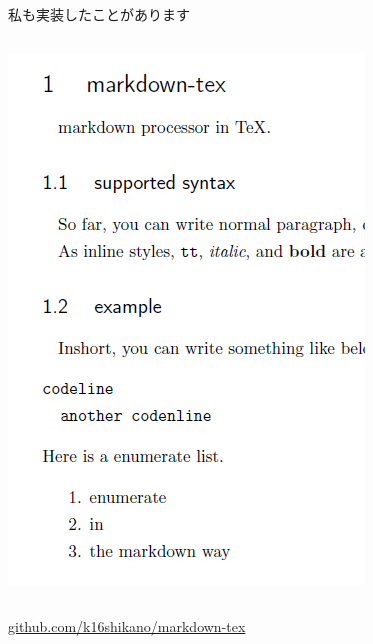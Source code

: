 \documentclass[14pt,dvipdfmx,uplatex]{beamer}
\begin{document}
\begin{frame}[t]{\inhibitglue 私も実装したことがあります}
\begin{center}
\begin{columns}[c]
\begin{column}{.4\textwidth}
      \includegraphics[width=\textwidth]{figures/mdtex-output.png}
      \end{column}
    \end{columns}
  \end{center}

    \raggedright
    \vbox{
    \href{https://github.com/k16shikano/markdown-tex}{github.com/k16shikano/markdown-tex}
    }

\end{frame}

\end{document}
